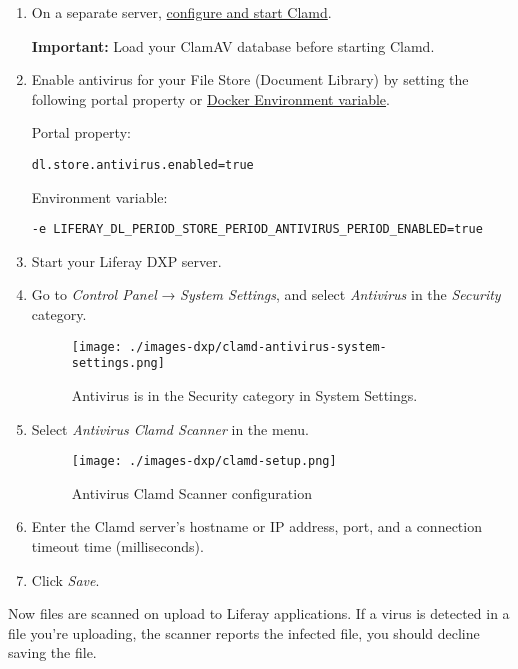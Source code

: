 \begin{enumerate}
\def\labelenumi{\arabic{enumi}.}
\item
  On a separate server,
  \href{https://www.clamav.net/documents/scanning\#clamd}{configure and
  start Clamd}.

  \textbf{Important:} Load your ClamAV database before starting Clamd.
\item
  Enable antivirus for your File Store (Document Library) by setting the
  following portal property or
  \href{https://learn.liferay.com/dxp/7.x/en/installation-and-upgrades/installing-liferay/using-liferay-docker-images/configuring-containers.html\#using-liferay-env-variables}{Docker
  Environment variable}.

  Portal property:

\begin{verbatim}
dl.store.antivirus.enabled=true
\end{verbatim}

  Environment variable:

\begin{verbatim}
-e LIFERAY_DL_PERIOD_STORE_PERIOD_ANTIVIRUS_PERIOD_ENABLED=true
\end{verbatim}
\item
  Start your Liferay DXP server.
\item
  Go to \emph{Control Panel} → \emph{System Settings}, and select
  \emph{Antivirus} in the \emph{Security} category.

  \begin{figure}
  \centering
  \texttt{[image: ./images-dxp/clamd-antivirus-system-settings.png]}
  \caption{Antivirus is in the Security category in System Settings.}
  \end{figure}
\item
  Select \emph{Antivirus Clamd Scanner} in the menu.

  \begin{figure}
  \centering
  \texttt{[image: ./images-dxp/clamd-setup.png]}
  \caption{Antivirus Clamd Scanner configuration}
  \end{figure}
\item
  Enter the Clamd server's hostname or IP address, port, and a
  connection timeout time (milliseconds).
\item
  Click \emph{Save}.
\end{enumerate}

Now files are scanned on upload to Liferay applications. If a virus is
detected in a file you're uploading, the scanner reports the infected
file, you should decline saving the file.

